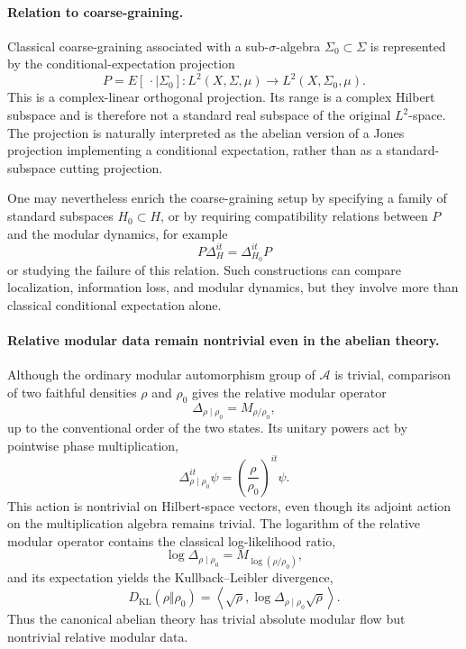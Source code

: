 \documentclass[a4paper,11pt]{article}
\theoremstyle{definition}
\begin{document}
\paragraph{Relation to coarse-graining.}
Classical coarse-graining associated with a sub-\(\sigma\)-algebra \(\Sigma_0\subset\Sigma\) is represented by the conditional-expectation projection
\[
    P=E[\,\cdot\mid\Sigma_0]:L^2(X,\Sigma,\mu)\to
    L^2(X,\Sigma_0,\mu).
\]
This is a complex-linear orthogonal projection. Its range is a complex Hilbert subspace and is therefore not a standard real subspace of the original \(L^2\)-space. The projection is naturally interpreted as the abelian version of a Jones projection implementing a conditional expectation, rather than as a standard-subspace cutting projection.

One may nevertheless enrich the coarse-graining setup by specifying a family of standard subspaces \(H_0\subset H\), or by requiring compatibility relations between \(P\) and the modular dynamics, for example
\[
    P\Delta_H^{it}=\Delta_{H_0}^{it}P
\]
or studying the failure of this relation. Such constructions can compare localization, information loss, and modular dynamics, but they involve more than classical conditional expectation alone.

\paragraph{Relative modular data remain nontrivial even in the abelian theory.}
Although the ordinary modular automorphism group of \(\mathcal{A}\) is trivial, comparison of two faithful densities \(\rho\) and \(\rho_0\) gives the relative modular operator
\[
    \Delta_{\rho\mid\rho_0}=M_{\rho/\rho_0},
\]
up to the conventional order of the two states. Its unitary powers act by pointwise phase multiplication,
\[
    \Delta_{\rho\mid\rho_0}^{it}\psi
    =\left(\frac{\rho}{\rho_0}\right)^{it}\psi.
\]
This action is nontrivial on Hilbert-space vectors, even though its adjoint action on the multiplication algebra remains trivial. The logarithm of the relative modular operator contains the classical log-likelihood ratio,
\[
    \log\Delta_{\rho\mid\rho_0}
    =M_{\log(\rho/\rho_0)},
\]
and its expectation yields the Kullback--Leibler divergence,
\[
    D_{\mathrm{KL}}(\rho\Vert\rho_0)
    =\left\langle\sqrt\rho,
    \log\Delta_{\rho\mid\rho_0}\sqrt\rho\right\rangle.
\]
Thus the canonical abelian theory has trivial absolute modular flow but nontrivial relative modular data.
\end{document}
